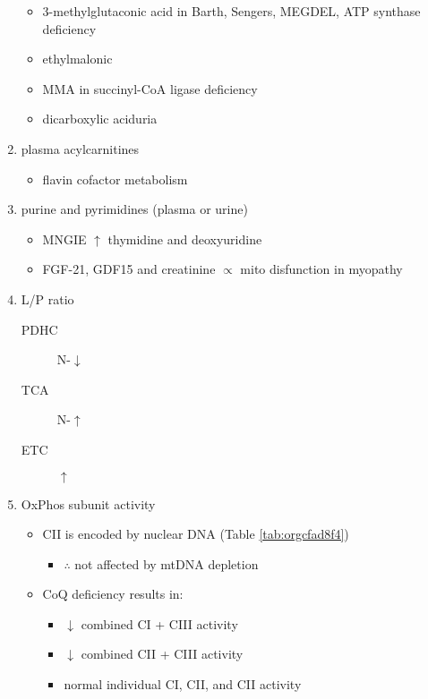 \documentclass[12pt]{scrartcl}
\begin{document}
\begin{enumerate}
\begin{itemize}
\begin{itemize}
\end{itemize}
\item 3-methylglutaconic acid in Barth, Sengers, MEGDEL, ATP synthase deficiency
\item ethylmalonic
\item MMA in succinyl-CoA ligase deficiency
\item dicarboxylic aciduria
\end{itemize}
\item plasma acylcarnitines
\label{sec:org50815da}
\begin{itemize}
\item flavin cofactor metabolism
\end{itemize}
\item purine and pyrimidines (plasma or urine)
\label{sec:org658e13b}
\begin{itemize}
\item MNGIE \(\uparrow\) thymidine and deoxyuridine
\end{itemize}
\begin{itemize}
\item FGF-21, GDF15 and creatinine \(\propto\) mito disfunction in myopathy
\end{itemize}

\item L/P ratio
\label{sec:orge7d2c77}
\begin{description}
\item[{PDHC}] N-\(\downarrow\)
\item[{TCA}] N-\(\uparrow\)
\item[{ETC}] \(\uparrow\)
\end{description}
\item OxPhos subunit activity
\label{sec:org1932a68}
\begin{itemize}
\item CII is encoded by nuclear DNA (Table \ref{tab:orgcfad8f4})
\begin{itemize}
\item \(\therefore\) not affected by mtDNA depletion
\end{itemize}
\item CoQ deficiency results in:
\begin{itemize}
\item \(\downarrow\) combined CI + CIII activity
\item \(\downarrow\) combined CII + CIII activity
\item normal individual CI, CII, and CII activity
\end{itemize}
\end{itemize}
\end{enumerate}
\end{document}

